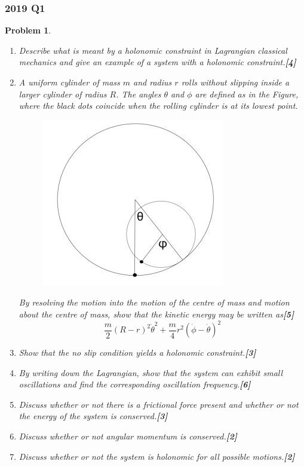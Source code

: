 \documentclass[a4paper]{article}
\theoremstyle{new}
\newtheorem{qns}{Problem}[section]
\begin{document}
\subsubsection*{2019 Q1}
\begin{qns}\leavevmode
\begin{enumerate}[label=(\alph*)]
\item Describe what is meant by a holonomic constraint in Lagrangian classical mechanics and give an example of a system with a holonomic constraint.\hfill\textbf{[4]}
\item A uniform cylinder of mass $m$ and radius $r$ rolls without slipping inside a larger cylinder of radius $R$. The angles $\theta$ and $\phi$ are defined as in the Figure, where the black dots coincide when the rolling cylinder is at its lowest point.
\begin{figure}[H]
    \centering
    \includegraphics[scale=0.7]{2019TP1Q2.JPG}
\end{figure}
By resolving the motion into the motion of the centre of mass and motion about the centre of mass, show that the kinetic energy may be written as\hfill\textbf{[5]}
$$\frac{m}{2}(R-r)^2\dot{\theta}^2+\frac{m}{4}r^2(\dot{\phi}-\dot{\theta})^2$$
\item Show that the no slip condition yields a holonomic constraint.\hfill \textbf{[3]}
\item By writing down the Lagrangian, show that the system can exhibit small oscillations and find the corresponding oscillation frequency.\hfill\textbf{[6]}
\item Discuss whether or not there is a frictional force present and whether or not the energy of the system is conserved.\hfill\textbf{[3]}
\item Discuss whether or not angular momentum is conserved.\hfill\textbf{[2]}
\item Discuss whether or not the system is holonomic for all possible motions.\hfill\textbf{[2]}
\end{enumerate}
\end{qns}
\end{document}

